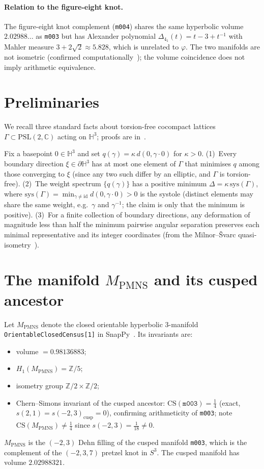 \documentclass[12pt]{article}
\theoremstyle{definition}
\theoremstyle{remark}
\newcommand{\Hthree}{\mathbb{H}^3}
\newcommand{\Z}{\mathbb{Z}}
\newcommand{\C}{\mathbb{C}}
\newcommand{\vp}{\varphi}
\begin{document}
\paragraph{Relation to the figure-eight knot.}
The figure-eight knot complement (\texttt{m004}) shares the same
hyperbolic volume $2.02988\ldots$ as \texttt{m003} but has Alexander
polynomial $\Delta_{4_1}(t)=t-3+t^{-1}$ with Mahler measure
$3+2\sqrt2\approx5.828$, which is unrelated to $\vp$.  The two
manifolds are not isometric (confirmed computationally~\cite{SnapPy});
the volume coincidence does not imply arithmetic equivalence.

\section{Preliminaries}
\label{sec:prelim}

We recall three standard facts about torsion-free cocompact lattices
$\Gamma\subset\mathrm{PSL}(2,\C)$ acting on $\Hthree$; proofs are
in~\cite{ratcliffe,bridsonhaefliger}.

Fix a basepoint $0\in\Hthree$ and set $q(\gamma)=\kappa\,d(0,\gamma\cdot0)$
for $\kappa>0$.  (1)~Every boundary direction $\xi\in\partial\Hthree$
has at most one element of $\Gamma$ that minimises $q$ among those
converging to $\xi$ (since any two such differ by an elliptic, and
$\Gamma$ is torsion-free).  (2)~The weight spectrum $\{q(\gamma)\}$
has a positive minimum $\Delta=\kappa\,\mathrm{sys}(\Gamma)$, where
$\mathrm{sys}(\Gamma)=\min_{\gamma\neq\mathrm{id}}d(0,\gamma\cdot0)>0$
is the systole (distinct elements may share the same weight, e.g.\
$\gamma$ and $\gamma^{-1}$; the claim is only that the minimum is
positive).  (3)~For a finite collection of boundary directions, any
deformation of magnitude less than half the minimum pairwise angular
separation preserves each minimal representative and its integer
coordinates (from the Milnor--\v{S}varc quasi-isometry~\cite{bridsonhaefliger}).

\section{The manifold $M_{\mathrm{PMNS}}$ and its cusped ancestor}
\label{sec:manifold}

Let $M_{\mathrm{PMNS}}$ denote the closed orientable hyperbolic
3-manifold \texttt{OrientableClosedCensus[1]} in SnapPy~\cite{SnapPy}.
Its invariants are:
\begin{itemize}
\item volume $= 0.98136883$;
\item $H_1(M_{\mathrm{PMNS}})=\Z/5$;
\item isometry group $\Z/2\times\Z/2$;
\item Chern--Simons invariant of the cusped ancestor: $\mathrm{CS}(\texttt{m003})=\tfrac{1}{4}$ (exact, $s(2,1)=s(-2,3)_{\mathrm{cusp}}=0$), confirming arithmeticity of \texttt{m003}; note $\mathrm{CS}(M_{\mathrm{PMNS}})\neq\tfrac{1}{4}$ since $s(-2,3)=\tfrac{1}{18}\neq 0$.
\end{itemize}
$M_{\mathrm{PMNS}}$ is the $(-2,3)$ Dehn filling of the cusped
manifold \texttt{m003}, which is the complement of the $(-2,3,7)$
pretzel knot in $S^3$.  The cusped manifold has volume $2.02988321$.
\end{document}
